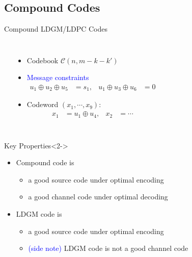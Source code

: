 \documentclass[10pt]{beamer}
\def\side_information_path{../compound-codes/isit14/slides/Figures}
\begin{document}
\subsection{Compound Codes}
\begin{frame}{Compound LDGM/LDPC Codes}
  \begin{columns}
    \begin{center}
      \setlength\tikzheight{5cm}
      \setlength\tikzwidth{6cm}
      \scalebox{0.5}{}
    \end{center}
    \begin{itemize}
    \item Codebook $\mathcal{C}(n,m-k-k')$ \vspace{0.1cm}
    \item \textcolor{blue}{Message constraints} \vspace{-0.2cm}
      \begin{align*}
        u_1\oplus u_2 \oplus u_5&=s_1, &  u_1\oplus u_3 \oplus u_6&=0
      \end{align*}
    \item Codeword $(x_1,\cdots,x_9)$: \vspace{-0.2cm}
      \begin{align*}
        x_1 &= u_1 \oplus u_4, & x_2 &= \cdots
      \end{align*}
    \end{itemize}
  \end{columns}
  \begin{block}{Key Properties}<2->
    \begin{itemize}
    \item Compound code is 
      \begin{itemize}
      \item a \alert{good source code} under optimal encoding
      \item a \alert{good channel code} under optimal decoding
      \end{itemize}
     \item LDGM code is 
       \begin{itemize}
       \item a \alert{good source code} under optimal encoding
       \item \textcolor{blue}{(side note)} LDGM code is \alert{not} a good channel code
       \end{itemize}
    \end{itemize}
  \end{block}
\end{frame}
\end{document}
